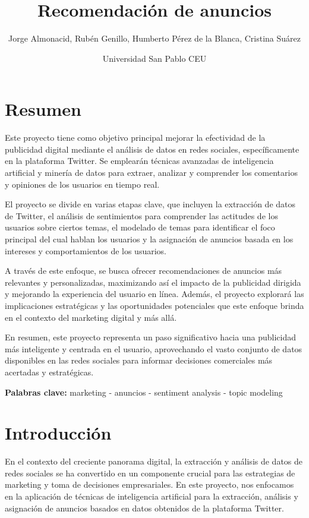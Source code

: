 \documentclass[
  letterpaper,
  DIV=11,
  numbers=noendperiod]{scrartcl}
\title{Recomendación de anuncios}
\author{Jorge Almonacid, Rubén Genillo, Humberto Pérez de la Blanca,
Cristina Suárez \and Universidad San Pablo CEU}
\date{}
\renewcommand*\contentsname{Tabla de contenidos}
\newcommand\contentsname{Tabla de contenidos}
\begin{document}
\maketitle

\renewcommand*\contentsname{Indice}
{
\hypersetup{linkcolor=}
\setcounter{tocdepth}{3}
\tableofcontents
}
\newpage{}

\section{Resumen}\label{resumen}

Este proyecto tiene como objetivo principal mejorar la efectividad de la
publicidad digital mediante el análisis de datos en redes sociales,
específicamente en la plataforma Twitter. Se emplearán técnicas
avanzadas de inteligencia artificial y minería de datos para extraer,
analizar y comprender los comentarios y opiniones de los usuarios en
tiempo real.

El proyecto se divide en varias etapas clave, que incluyen la extracción
de datos de Twitter, el análisis de sentimientos para comprender las
actitudes de los usuarios sobre ciertos temas, el modelado de temas para
identificar el foco principal del cual hablan los usuarios y la
asignación de anuncios basada en los intereses y comportamientos de los
usuarios.

A través de este enfoque, se busca ofrecer recomendaciones de anuncios
más relevantes y personalizadas, maximizando así el impacto de la
publicidad dirigida y mejorando la experiencia del usuario en línea.
Además, el proyecto explorará las implicaciones estratégicas y las
oportunidades potenciales que este enfoque brinda en el contexto del
marketing digital y más allá.

En resumen, este proyecto representa un paso significativo hacia una
publicidad más inteligente y centrada en el usuario, aprovechando el
vasto conjunto de datos disponibles en las redes sociales para informar
decisiones comerciales más acertadas y estratégicas.

\textbf{Palabras clave:} marketing - anuncios - sentiment analysis -
topic modeling

\newpage{}

\section{Introducción}\label{introducciuxf3n}

En el contexto del creciente panorama digital, la extracción y análisis
de datos de redes sociales se ha convertido en un componente crucial
para las estrategias de marketing y toma de decisiones empresariales. En
este proyecto, nos enfocamos en la aplicación de técnicas de
inteligencia artificial para la extracción, análisis y asignación de
anuncios basados en datos obtenidos de la plataforma Twitter.
\end{document}
